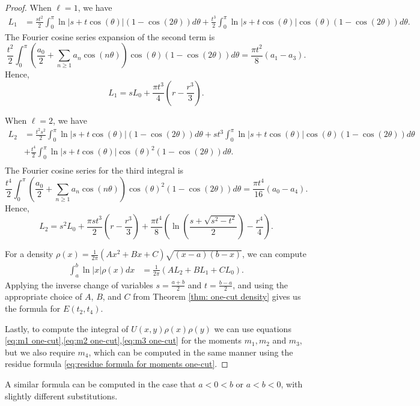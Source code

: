 \documentclass[10pt]{article}
\theoremstyle{plain}
\theoremstyle{definition}
\theoremstyle{plain}
\begin{document}
\begin{proof}
When $\ell =1$, we have 
\begin{align*}
 L_{1} &=\frac{st^2}{2}\int_{0}^{\pi} \ln|s+t\cos (\theta)| \left(1-\cos(2 \theta)\right) d \theta
 + \frac{t^3}{2}\int_{0}^{\pi} \ln|s+t\cos (\theta)| \cos (\theta)\left(1-\cos(2 \theta)\right) d \theta.
\end{align*}
The Fourier cosine series expansion of the second term is 
$$
 \frac{t^2}{2}\int_0^\pi\left(\frac{a_0}{2}+\sum_{n \geq 1} a_n \cos ( n \theta)\right)\cos(\theta)\left(1-\cos (2\theta)\right) d \theta= \frac{\pi t^2 }{8}(a_{1} -a_{3}).
$$
Hence, 
\begin{equation*}
 L_{1} = s L_{0} + \frac{\pi t^{3}}{4}\left(r - \frac{r^3}{3} \right).
\end{equation*}

When $\ell =2$, we have 
\begin{align*}
 L_{2} &=\frac{t^2s^2}{2}\int_{0}^{\pi} \ln|s+t\cos (\theta)| \left(1-\cos(2 \theta)\right) d \theta +st^3\int_{0}^{\pi} \ln|s+t\cos (\theta)|\cos(\theta) \left(1-\cos(2 \theta)\right) d \theta\\
 &+\frac{t^4}{2}\int_{0}^{\pi} \ln|s+t\cos (\theta)| \cos(\theta)^2\left(1-\cos(2 \theta)\right) d \theta.\\
\end{align*}
The Fourier cosine series for the third integral is 
\begin{equation*}
 \frac{t^{4}}{2}\int_0^\pi\left(\frac{a_0}{2}+\sum_{n \geq 1} a_n \cos (n \theta)\right)\cos(\theta)^2\left(1-\cos (2 \theta)\right) d \theta= \frac{\pi t^{4}}{16}(a_{0}-a_{4}).
\end{equation*}
Hence, 
\begin{equation*}
 L_{2} = s^2 L_{0} + \frac{\pi s t^3}{2}\left( r - \frac{r^3}{3}\right) + \frac{\pi t^{4}}{8}\left(\ln \left(\frac{s+\sqrt{s^2-t^2}}{2}\right) - \frac{r^{4}}{4}\right).
\end{equation*}



For a density 
$\rho(x) = \frac{1}{2\pi}(Ax^2 + Bx + C)\sqrt{(x-a)(b-x)}$, we can compute 
\begin{align*}
 \int_{a}^{b} \ln|x| \rho(x) dx &= \frac{1}{2 \pi}( AL_{2} + B L_{1} + CL_{0}).
\end{align*}
Applying the inverse change of variables $s =\frac{a+b}{2}$ and $t =\frac{b-a}{2}$, and using the appropriate choice of $A$, $B$, and $C$ from Theorem \ref{thm: one-cut density} gives us the formula for $E(t_{2},t_{4})$.



Lastly, to compute the integral of $U(x,y)\rho(x)\rho(y)$ we can use equations \eqref{eq:m1 one-cut},\eqref{eq:m2 one-cut},\eqref{eq:m3 one-cut} for the moments $m_{1},m_{2}$ and $m_{3}$, but we also require $m_{4}$, which can be computed in the same manner using the residue formula \eqref{eq:residue formula for moments one-cut}.
\end{proof}

A similar formula can be computed in the case that $a<0<b$ or $a<b<0$, with slightly different substitutions.


\end{document}

